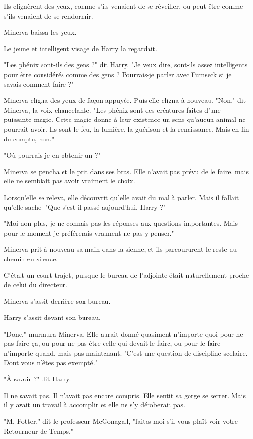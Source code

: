 Ils clignèrent des yeux, comme s'ils venaient de se réveiller, ou peut-être comme s'ils venaient de se rendormir.

Minerva baissa les yeux.

Le jeune et intelligent visage de Harry la regardait.

"Les phénix sont-ils des gens ?" dit Harry. "Je veux dire, sont-ils assez intelligents pour être considérés comme des gens ? Pourrais-je parler avec Fumseck si je savais comment faire ?"

Minerva cligna des yeux de façon appuyée. Puis elle cligna à nouveau. "Non," dit Minerva, la voix chancelante. "Les phénix sont des créatures faites d'une puissante magie. Cette magie donne à leur existence un sens qu'aucun animal ne pourrait avoir. Ils sont le feu, la lumière, la guérison et la renaissance. Mais en fin de compte, non."

"Où pourrais-je en obtenir un ?"

Minerva se pencha et le prit dans ses bras. Elle n'avait pas prévu de le faire, mais elle ne semblait pas avoir vraiment le choix.

Lorsqu'elle se releva, elle découvrit qu'elle avait du mal à parler. Mais il fallait qu'elle sache. "Que s'est-il passé aujourd'hui, Harry ?"

"Moi non plus, je ne connais pas les réponses aux questions importantes. Mais pour le moment je préférerais vraiment ne pas y penser."

Minerva prit à nouveau sa main dans la sienne, et ils parcoururent le reste du chemin en silence.

C'était un court trajet, puisque le bureau de l'adjointe était naturellement proche de celui du directeur.

Minerva s'assit derrière son bureau.

Harry s'assit devant son bureau.

"Donc," murmura Minerva. Elle aurait donné quasiment n'importe quoi pour ne pas faire ça, ou pour ne pas être celle qui devait le faire, ou pour le faire n'importe quand, mais pas maintenant. "C'est une question de discipline scolaire. Dont vous n'êtes pas exempté."

"À savoir ?" dit Harry.

Il ne savait pas. Il n'avait pas encore compris. Elle sentit sa gorge se serrer. Mais il y avait un travail à accomplir et elle ne s'y déroberait pas.

"M. Potter," dit le professeur McGonagall, "faites-moi s'il vous plaît voir votre Retourneur de Temps."

